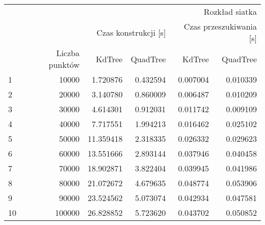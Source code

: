 \begin{tabular}{lrrrrr}
\toprule
 & \multicolumn{5}{r}{Rozkład siatka} \\
 &  & \multicolumn{2}{r}{Czas konstrukcji [s]} & \multicolumn{2}{r}{Czas przeszukiwania [s]} \\
 & Liczba punktów & KdTree & QuadTree & KdTree & QuadTree \\
\midrule
1 & 10000 & 1.720876 & 0.432594 & 0.007004 & 0.010339 \\
2 & 20000 & 3.140780 & 0.860009 & 0.006487 & 0.010209 \\
3 & 30000 & 4.614301 & 0.912031 & 0.011742 & 0.009109 \\
4 & 40000 & 7.717551 & 1.994213 & 0.016462 & 0.025102 \\
5 & 50000 & 11.359418 & 2.318335 & 0.026332 & 0.029623 \\
6 & 60000 & 13.551666 & 2.893144 & 0.037946 & 0.040458 \\
7 & 70000 & 18.902871 & 3.822404 & 0.039945 & 0.041986 \\
8 & 80000 & 21.072672 & 4.679635 & 0.048774 & 0.053906 \\
9 & 90000 & 23.524562 & 5.073074 & 0.042934 & 0.047581 \\
10 & 100000 & 26.828852 & 5.723620 & 0.043702 & 0.050852 \\
\bottomrule
\end{tabular}
